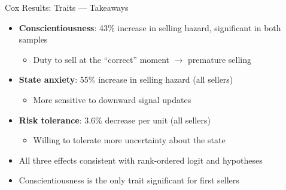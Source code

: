 \documentclass{beamer}
\begin{document}
\begin{frame}{Cox Results: Traits --- Takeaways}
\begin{itemize}
    \item \textbf{Conscientiousness}: 43\% increase in selling hazard, significant in both samples
    \begin{itemize}
        \item Duty to sell at the ``correct'' moment $\rightarrow$ premature selling
    \end{itemize}
    \item \textbf{State anxiety}: 55\% increase in selling hazard (all sellers)
    \begin{itemize}
        \item More sensitive to downward signal updates
    \end{itemize}
    \item \textbf{Risk tolerance}: 3.6\% decrease per unit (all sellers)
    \begin{itemize}
        \item Willing to tolerate more uncertainty about the state
    \end{itemize}
    \item All three effects consistent with rank-ordered logit and hypotheses
    \item Conscientiousness is the only trait significant for first sellers
\end{itemize}
\end{frame}
\end{document}
